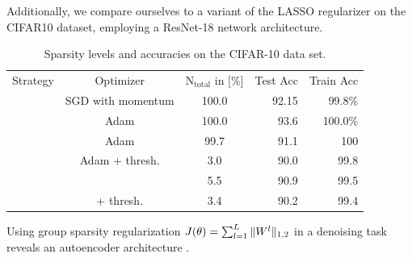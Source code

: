\begin{minipage}[t]{\textwidth}
\begin{minipage}[b][\bottomstripheight][b]{.48\textwidth}
\begin{figure}
\begin{minipage}{.3\textwidth}
\end{minipage}%
\end{figure}%
%
%
%
\vfill%
Additionally, we compare ourselves to a variant of the LASSO \cite{tibshirani1996regression} regularizer on the CIFAR10 dataset, employing a ResNet-18 network architecture.
%
%
%
\begin{table}[htb]
\scriptsize
\begin{minipage}{.69\textwidth}%
\begin{tabularx}{\textwidth}{|c||c c|R R|}
Strategy & Optimizer & 
$\mathrm{N}_{\mathrm{total}}$ in [\%] & 
Test Acc&Train Acc\\
\hhline{|=====|}
&SGD with momentum &100.0&92.15&99.8\%\\
&Adam &100.0&93.6&100.0\%\\
\hhline{-----}
        &Adam &99.7&91.1 &100\\
        &Adam + thresh.&3.0&90.0 &99.8\\
\hhline{-----}
                &\LinBreg{} &5.5&90.9&99.5\\
                &\LinBreg{} + thresh.&3.4&90.2&99.4\\
\end{tabularx}
\end{minipage}%
\begin{minipage}{.01\textwidth}%
\phantom{2}
\end{minipage}%
%
\begin{minipage}{.3\textwidth}%
\caption{\small Sparsity levels and accuracies on the CIFAR-10 data set.}\label{tab:CIFAR}
\end{minipage}
\end{table}
%
%
%
%
%
%
\end{minipage}%
%
\hfill%
%
%
%
\hfill%
%
%
%
%
%
%
%
\noindent\begin{minipage}[b][\bottomstripheight][b]{.48\textwidth}%
%
%
\small%
Using group sparsity regularization $J(\theta) = \sum_{l=1}^L\Vert W^l\Vert_{1,2}$ in a denoising task reveals an autoencoder architecture
\cite{bungert21}.


\end{minipage}
\end{minipage}
